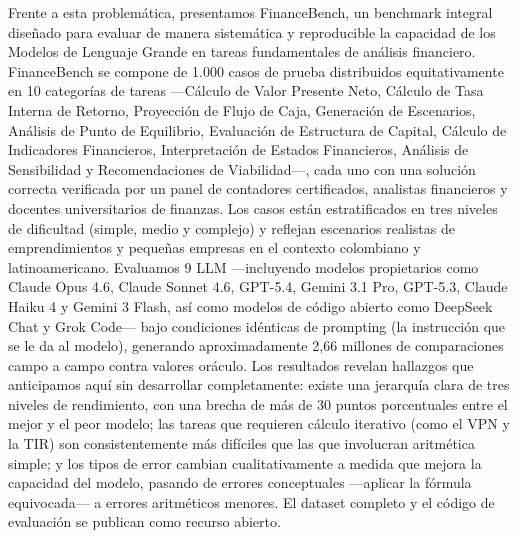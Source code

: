 \documentclass[12pt,a4paper]{article}
\begin{document}
Frente a esta problemática, presentamos FinanceBench, un benchmark integral diseñado para evaluar de manera sistemática y reproducible la capacidad de los Modelos de Lenguaje Grande en tareas fundamentales de análisis financiero. FinanceBench se compone de 1.000 casos de prueba distribuidos equitativamente en 10 categorías de tareas ---Cálculo de Valor Presente Neto, Cálculo de Tasa Interna de Retorno, Proyección de Flujo de Caja, Generación de Escenarios, Análisis de Punto de Equilibrio, Evaluación de Estructura de Capital, Cálculo de Indicadores Financieros, Interpretación de Estados Financieros, Análisis de Sensibilidad y Recomendaciones de Viabilidad---, cada uno con una solución correcta verificada por un panel de contadores certificados, analistas financieros y docentes universitarios de finanzas. Los casos están estratificados en tres niveles de dificultad (simple, medio y complejo) y reflejan escenarios realistas de emprendimientos y pequeñas empresas en el contexto colombiano y latinoamericano. Evaluamos 9 LLM ---incluyendo modelos propietarios como Claude Opus 4.6, Claude Sonnet 4.6, GPT-5.4, Gemini 3.1 Pro, GPT-5.3, Claude Haiku 4 y Gemini 3 Flash, así como modelos de código abierto como DeepSeek Chat y Grok Code--- bajo condiciones idénticas de prompting (la instrucción que se le da al modelo), generando aproximadamente 2,66 millones de comparaciones campo a campo contra valores oráculo. Los resultados revelan hallazgos que anticipamos aquí sin desarrollar completamente: existe una jerarquía clara de tres niveles de rendimiento, con una brecha de más de 30 puntos porcentuales entre el mejor y el peor modelo; las tareas que requieren cálculo iterativo (como el VPN y la TIR) son consistentemente más difíciles que las que involucran aritmética simple; y los tipos de error cambian cualitativamente a medida que mejora la capacidad del modelo, pasando de errores conceptuales ---aplicar la fórmula equivocada--- a errores aritméticos menores. El dataset completo y el código de evaluación se publican como recurso abierto.
\end{document}
